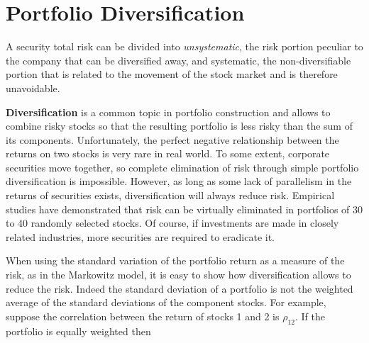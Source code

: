 \section{Portfolio Diversification}

A security total risk can be divided into \emph{unsystematic}, the risk portion peculiar to the company that can be diversified away, and systematic, the non-diversifiable portion that is related to the movement of the stock market and is therefore unavoidable.

\textbf{Diversification} is a common topic in portfolio construction and allows to combine risky stocks so that the resulting portfolio is less risky than the sum of its components. 
Unfortunately, the perfect negative relationship between the returns on two stocks is very rare in real world. To some extent, corporate securities move together, so complete elimination of risk through simple portfolio diversification is impossible. However, as long as some lack of parallelism in the returns of securities exists, diversification will always reduce risk.
Empirical studies have demonstrated that risk can be virtually eliminated in portfolios of 30 to 40 randomly selected stocks. Of course, if investments are made in closely related industries, more securities are required to eradicate it.

When using the standard variation of the portfolio return as a measure of the risk, as in the Markowitz model, it is easy to show how diversification allows to reduce the risk.
Indeed the standard deviation of a portfolio is not the weighted average of the standard deviations of the component stocks.
For example, suppose the correlation between the return of stocks 1 and 2 is $\rho_{12}$. If the portfolio is equally weighted then

